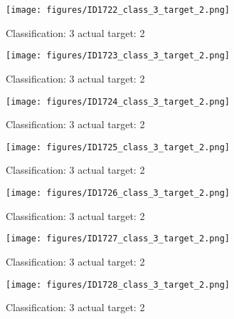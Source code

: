 \begin{figure}[h!]
\begin{center}
\texttt{[image: figures/ID1722\_class\_3\_target\_2.png]}
\end{center}
\caption{ Classification: 3 actual target: 2}
\label{fig:ID1722_class_3_target_2}
\end{figure}
\begin{figure}[h!]
\begin{center}
\texttt{[image: figures/ID1723\_class\_3\_target\_2.png]}
\end{center}
\caption{ Classification: 3 actual target: 2}
\label{fig:ID1723_class_3_target_2}
\end{figure}
\begin{figure}[h!]
\begin{center}
\texttt{[image: figures/ID1724\_class\_3\_target\_2.png]}
\end{center}
\caption{ Classification: 3 actual target: 2}
\label{fig:ID1724_class_3_target_2}
\end{figure}
\begin{figure}[h!]
\begin{center}
\texttt{[image: figures/ID1725\_class\_3\_target\_2.png]}
\end{center}
\caption{ Classification: 3 actual target: 2}
\label{fig:ID1725_class_3_target_2}
\end{figure}
\begin{figure}[h!]
\begin{center}
\texttt{[image: figures/ID1726\_class\_3\_target\_2.png]}
\end{center}
\caption{ Classification: 3 actual target: 2}
\label{fig:ID1726_class_3_target_2}
\end{figure}
\begin{figure}[h!]
\begin{center}
\texttt{[image: figures/ID1727\_class\_3\_target\_2.png]}
\end{center}
\caption{ Classification: 3 actual target: 2}
\label{fig:ID1727_class_3_target_2}
\end{figure}
\begin{figure}[h!]
\begin{center}
\texttt{[image: figures/ID1728\_class\_3\_target\_2.png]}
\end{center}
\caption{ Classification: 3 actual target: 2}
\label{fig:ID1728_class_3_target_2}
\end{figure}
